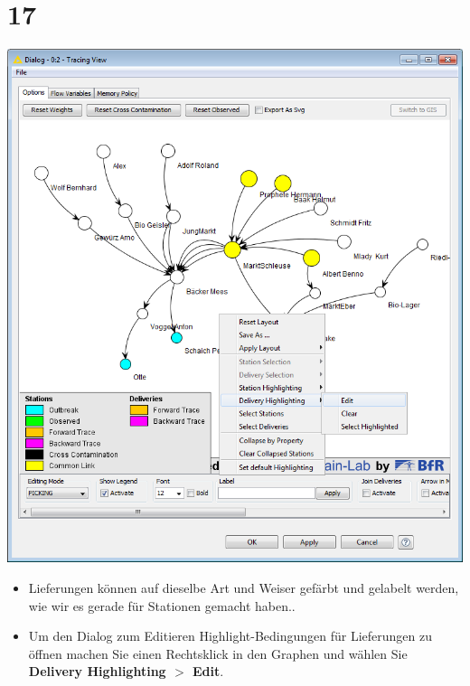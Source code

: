 \documentclass{beamer}
\begin{document}
\section{17}
\begin{frame}
	\begin{center}
  		\includegraphics[height=0.6\textheight]{17.png}
	\end{center}
	\begin{itemize}
		\item Lieferungen können auf dieselbe Art und Weiser gefärbt und gelabelt werden, wie wir es gerade für Stationen gemacht haben..
		\item Um den Dialog zum Editieren Highlight-Bedingungen für Lieferungen zu öffnen machen Sie einen Rechtsklick in den Graphen und wählen Sie \textbf{Delivery Highlighting $>$ Edit}.
	\end{itemize}
\end{frame}
\end{document}
